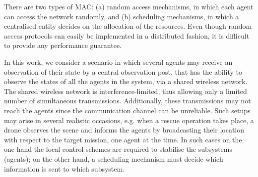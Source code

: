 \documentclass[letterpaper, 10 pt, conference]{ieeeconf}  %
\newcommand{\todo}[1]{
	\begin{center}
		\fcolorbox{wheat}{wheat}{\parbox[t]{0.9\linewidth}{\textbf{ToDo:} #1}}
	\end{center}}
\begin{document}
There are two types of MAC: (a) random access mechanisms, in which each agent can access the network randomly, and (b) scheduling mechanisms, in which a centralised entity decides on the allocation of the resources. Even though random access protocols can easily be implemented in a distributed fashion, it is difficult to provide any performance guarantee.

In this work, we consider a scenario in which several agents may receive an observation of their state by a central observation post, that has the ability to observe the states of all the agents in the system, via a shared wireless network. The shared wireless network is interference-limited, thus allowing only a limited number of simultaneous transmissions. Additionally, these transmissions may not reach the agents since the communication channel can be unreliable. Such setups may arise in several realistic occasions, e.g. when a rescue operation takes place, a drone observes the scene and informs the agents by broadcasting their location with respect to the target mission, one agent at the time. In such cases %
on the one hand the local control schemes are required to stabilise the subsystems (agents); on the other hand, a scheduling mechanism must decide which information is sent to which subsystem. %

\end{document}
